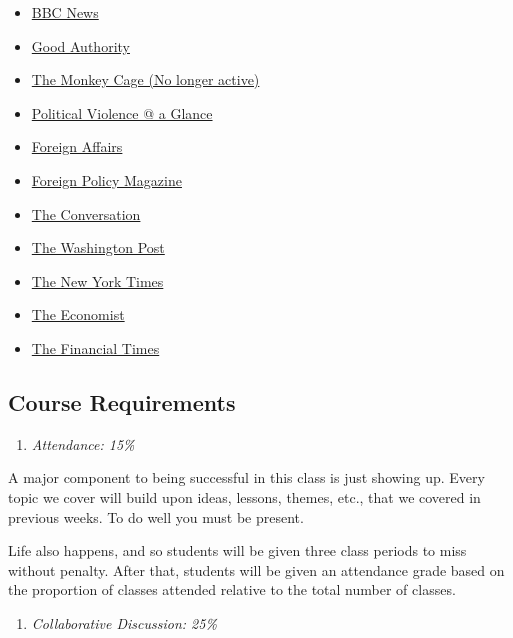\documentclass[
  letterpaper,
  DIV=11,
  numbers=noendperiod]{scrartcl}
\providecommand{\tightlist}{%
  \setlength{\itemsep}{0pt}\setlength{\parskip}{0pt}}
\begin{document}
\begin{itemize}
\tightlist
\item
  \href{www.bbc.com/news}{BBC News}
\item
  \href{https://goodauthority.org/}{Good Authority}
\item
  \href{www.washingtonpost.com/news/monkeycage}{The Monkey Cage (No
  longer active)}
\item
  \href{www.politicalviolenceataglance.org}{Political Violence @ a
  Glance}
\item
  \href{www.foreignaffairs.com}{Foreign Affairs}
\item
  \href{www.foreignpolicy.com}{Foreign Policy Magazine}
\item
  \href{https://theconversation.com/us}{The Conversation}
\item
  \href{www.washingtonpost.com}{The Washington Post}
\item
  \href{www.nytimes.com}{The New York Times}
\item
  \href{www.economist.com}{The Economist}
\item
  \href{www.ft.com}{The Financial Times}
\end{itemize}

\subsection{Course Requirements}\label{course-requirements}

\begin{enumerate}
\def\labelenumi{\arabic{enumi}.}
\tightlist
\item
  \emph{Attendance: 15\%}
\end{enumerate}

A major component to being successful in this class is just showing up.
Every topic we cover will build upon ideas, lessons, themes, etc., that
we covered in previous weeks. To do well you must be present.

Life also happens, and so students will be given three class periods to
miss without penalty. After that, students will be given an attendance
grade based on the proportion of classes attended relative to the total
number of classes.

\begin{enumerate}
\def\labelenumi{\arabic{enumi}.}
\setcounter{enumi}{1}
\tightlist
\item
  \emph{Collaborative Discussion: 25\%}
\end{enumerate}
\end{document}
